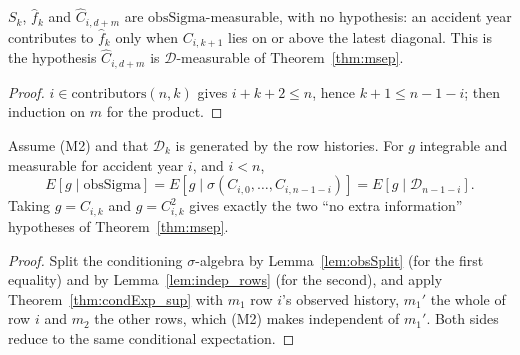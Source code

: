 \begin{lemma}\label{lem:clObs}\leanok
{}
$S_k$, $\hat f_k$ and $\hat C_{i,d+m}$ are $\mathrm{obsSigma}$-measurable, with no hypothesis: an
accident year contributes to $\hat f_k$ only when $C_{i,k+1}$ lies on or above the latest diagonal.
This is the hypothesis $\hat C_{i,d+m}$ is $\mathcal{D}$-measurable of Theorem~\ref{thm:msep}.
\end{lemma}
\begin{proof}\leanok
$i \in \mathrm{contributors}(n,k)$ gives $i + k + 2 \le n$, hence $k+1 \le n-1-i$; then induction on
$m$ for the product.
\end{proof}

\begin{theorem}\label{thm:noFurtherInfo}\leanok
{}
Assume (M2) and that $\mathcal D_k$ is generated by the row histories. For $g$
integrable and measurable for accident year $i$, and $i < n$,
\[
  E[g \mid \mathrm{obsSigma}] = E[g \mid \sigma(C_{i,0},\dots,C_{i,n-1-i})]
  = E[g \mid \mathcal{D}_{n-1-i}] .
\]
Taking $g = C_{i,k}$ and $g = C_{i,k}^2$ gives exactly the two ``no extra information''
hypotheses of Theorem~\ref{thm:msep}.
\end{theorem}
\begin{proof}\leanok
Split the conditioning $\sigma$-algebra by Lemma~\ref{lem:obsSplit} (for the first equality) and by
Lemma~\ref{lem:indep_rows} (for the second), and apply Theorem~\ref{thm:condExp_sup} with $m_1$ row
$i$'s observed history, $m_1'$ the whole of row $i$ and $m_2$ the other rows, which (M2) makes
independent of $m_1'$. Both sides reduce to the same conditional expectation.
\end{proof}

